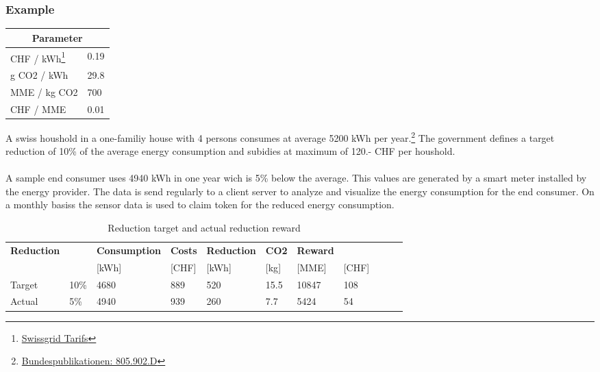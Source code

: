 \documentclass[11pt]{article}
\begin{document}
\subsubsection{Example}
\begin{table}
\begin{tabular}{ll}
\multicolumn{2}{c}{\textbf{Parameter}}                                                                                                                 \\ \hline
CHF / kWh\footnote{\href{https://www.swissgrid.ch/en/home/customers/topics/tariffs.html}{Swissgrid Tarifs}} & 0.19 \\ \hline
g CO2 / kWh                                                                                                                                     & 29.8 \\ \hline
MME / kg CO2                                                                                                                                    & 700  \\ \hline
CHF / MME                                                                                                                                       & 0.01
\end{tabular}
\end{table}
A swiss houshold in a one-familiy house with 4 persons consumes at average 5200  kWh per year.\footnote{\href{https://www.bundespublikationen.admin.ch/cshop_mimes_bbl/2C/2C59E545D7371ED5BB89418480F1B62D.pdf}{Bundespublikationen: 805.902.D}} The government defines a target reduction of 10\% of the average energy consumption and subidies at maximum of 120.- CHF per houshold. \\\\
A sample end consumer uses 4940 kWh in one year wich is 5\% below the average. This values are generated by a smart meter installed by the energy provider. The data is send regularly to a client server to analyze and visualize the energy consumption for the end consumer. On a monthly basiss the sensor data is used to claim token for the reduced energy consumption.

\begin{table}[ht]
\begin{tabular}{ll|llllll|lll}
\textbf{Reduction} & \textbf{} & \textbf{Consumption} & \textbf{Costs} & \textbf{Reduction} & \textbf{CO2} & \textbf{Reward} &           \\
                   &           & {[}kWh{]}            & {[}CHF{]}      & {[}kWh{]}          & {[}kg{]}     & {[}MME{]}       & {[}CHF{]} \\ \hline
Target             & 10\%      & 4680                 & 889            & 520                & 15.5         & 10847           & 108       \\
Actual             & 5\%       & 4940                 & 939            & 260                & 7.7          & 5424            & 54       
\end{tabular}
\caption{Reduction target and actual reduction reward}
\label{target_actual}
\end{table}
\end{document}
